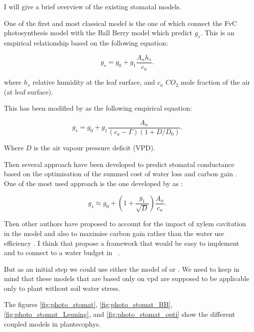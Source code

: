 \documentclass[a4paper,11pt]{article}
\begin{document}
I will give a brief overview of the existing stomatal models.

One of the first and most classical model is the one of \citet{Collatz-1991} which connect the FvC photosynthesis model with the Ball Berry model which predict $g_s$. This is an empirical relationship based on the following equation:

\begin{equation}
\label{eq:gs-Ball}
g_s= g_0 + g_1 \frac{A_n h_s}{c_a}.
\end{equation}

where $h_s$ relative humidity at the leaf surface, and $c_a$ $CO_2$ mole fraction of the air (at leaf surface).

This has been modified by \citet{Leuning-1995} as the following empirical equation:

\begin{equation}
\label{eq:gs-Leuning}
g_s= g_0 + g_1 \frac{A_n }{(c_a - \Gamma)(1+D/D_0)}.
\end{equation}

Where $D$ is the air vapour pressure deficit (VPD).

Then several approach have been developed to predict stomatal conductance based on the optimisation of the summed cost of water loss and carbon gain \citep{Medlyn-2002,Prentice-2014,Wolf-2016,Sperry-2017}. One of the most used approach is the one developed by \citet{Medlyn-2011} as :

\begin{equation}
\label{eq:gs-Medlyn}
g_s \approx g_0 + (1 + \frac{g_1}{\sqrt{D}}) \frac{A_n }{c_a}.
\end{equation}


Then other authors have proposed to account for the impact of xylem cavitation \citet{Wolf-2016,Sperry-2016,Sperry-2017} in the model and also to maximise carbon gain rather than the water use efficiency \citet{Wolf-2016}. I think that \citep{Sperry-2016} propose a framework that would be easy to implement and to connect to a water budget in \plant\ .

But as an initial step we could use either the model of \citet{Medlyn-2011} or \citet{Leuning-1995}. We need to keep in mind that these models that are based only on vpd are supposed to be applicable only to plant without soil water stress.

The figures \ref{fig:photo_stomat}, \ref{fig:photo_stomat_BB}, \ref{fig:photo_stomat_Leuning}, and \ref{fig:photo_stomat_opti} show the different coupled models in plantecophys.
\end{document}
